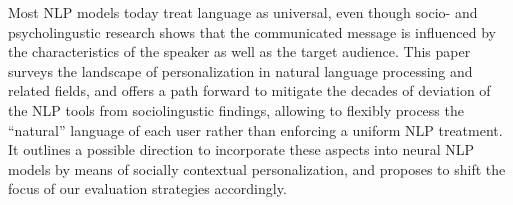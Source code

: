Most NLP models today treat language as universal, even though socio- and psycholingustic research shows that the communicated message is influenced by the characteristics of the speaker as well as the target audience. This paper surveys the landscape of personalization in natural language processing and related fields, and offers a path forward to mitigate the decades of deviation of the NLP tools from sociolingustic findings, allowing to flexibly process the ``natural'' language of each user rather than enforcing a uniform NLP treatment. It outlines a possible direction to incorporate these aspects into neural NLP models by means of socially contextual personalization, and proposes to shift the focus of our evaluation strategies accordingly.
